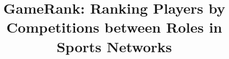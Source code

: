 \documentclass{sig-alternate}
\begin{document}


\title{GameRank: Ranking Players by Competitions between Roles in Sports Networks}


\maketitle

\begin{abstract}



\end{abstract}

\end{document}
